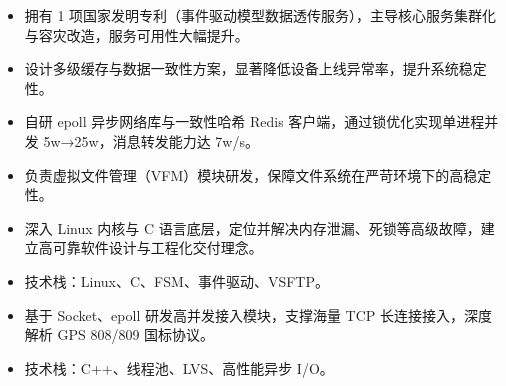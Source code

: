 \vspace{0.2cm}


\begin{itemize}
    \item 拥有 1 项国家发明专利（事件驱动模型数据透传服务），主导核心服务集群化与容灾改造，服务可用性大幅提升。
    \item 设计多级缓存与数据一致性方案，显著降低设备上线异常率，提升系统稳定性。
    \item 自研 epoll 异步网络库与一致性哈希 Redis 客户端，通过锁优化实现单进程并发 5w→25w，消息转发能力达 7w/s。
\end{itemize}

\vspace{0.2cm}


\begin{itemize}
    \item 负责虚拟文件管理（VFM）模块研发，保障文件系统在严苛环境下的高稳定性。
    \item 深入 Linux 内核与 C 语言底层，定位并解决内存泄漏、死锁等高级故障，建立高可靠软件设计与工程化交付理念。
    \item 技术栈：Linux、C、FSM、事件驱动、VSFTP。
\end{itemize}

\vspace{0.2cm}


\begin{itemize}
    \item 基于 Socket、epoll 研发高并发接入模块，支撑海量 TCP 长连接接入，深度解析 GPS 808/809 国标协议。
    \item 技术栈：C++、线程池、LVS、高性能异步 I/O。
\end{itemize}

\vspace{0.2cm}

